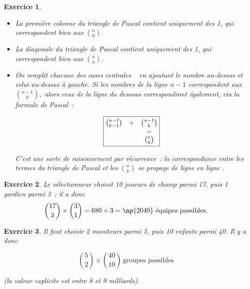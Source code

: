 \documentclass[10pt]{article}
\newtheorem{exo}{Exercice}
\begin{document}
\begin{exo}
\begin{itemize}
\item[\textbullet] La première colonne  du triangle de Pascal contient uniquement des 1, qui correspondent bien aux $\binom{n}{0}.$
\item[\textbullet] La diagonale  du triangle de Pascal contient uniquement des 1, qui correspondent bien aux $\binom{n}{n}.$
\item[\textbullet] On remplit chacune des cases \og centrales \fg~{} en ajoutant le nombre au-dessus et celui au-dessus à gauche. Si les nombres de la ligne $n-1$ correspondent aux $\binom{n-1}{k},$ alors ceux de la ligne du dessous correspondront également, via la formule de Pascal~:

\LARGE
\[\boxed{\begin{matrix}
\binom{n-1}{k-1}&\textcolor{blue}{+}&\binom{n-1}{k}\\
& &\textcolor{blue}{=}\\
& & \binom{n}{k}
\end{matrix}}\]
\normalsize

C'est une sorte de raisonnement par récurrence~: la correspondance entre les termes du triangle de Pascal et les $\binom{n}{k}$ \og se propage de ligne en ligne \fg.
\end{itemize}

\end{exo}



\begin{exo}

Le sélectionneur choisit 10 joueurs de champ parmi 17, puis 1 gardien parmi 3~; il a donc
\[\binom{17}{3}\times \binom{3}{1}=680\times 3=\np{2040}~\text{équipes possibles.}\]

\end{exo}

\begin{exo}

Il faut choisir 2 moniteurs parmi 5, puis 10 enfants parmi 40. Il y a donc

\[\binom{5}{2}\times \binom{40}{10}~\text{groupes possibles}\]

(la valeur explicite est entre 8 et 9 milliards).


\end{exo}
\end{document}
